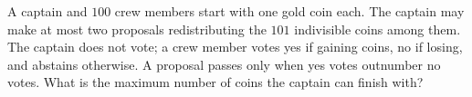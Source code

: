 A captain and $100$ crew members start with one gold coin each. The captain may make at most two proposals redistributing the $101$ indivisible coins among them. The captain does not vote; a crew member votes yes if gaining coins, no if losing, and abstains otherwise. A proposal passes only when yes votes outnumber no votes. What is the maximum number of coins the captain can finish with?
